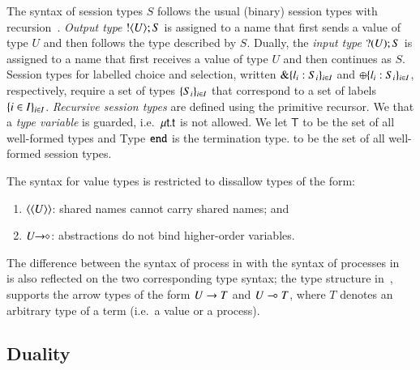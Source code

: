 The syntax of session types $S$ follows the usual
(binary) session types with
recursion~\cite{honda.vasconcelos.kubo:language-primitives,GH05}.
{\em Output type} $! \langle U \rangle ; S$ is assigned to a name that
first sends a value of type $U$ and then follows
the type described by $S$.
Dually, the {\em input type} $? (U) ; S$ is assigned to a name
that first receives a value of type $U$ and then continues as $S$. 
Session types for labelled choice and selection, 
written $\& \{l_i:S_i\}_{i \in I}$ and $\oplus \{l_i:S_i\}_{i \in I}$, respectively,
require a set of types $\{S_i\}_{i \in I}$ that correspond to a set of
labels $\{i \in I\}_{i \in I}$. 
{\em Recursive session types} are defined using the primitive recursor.
We that a {\em type variable} is guarded, i.e.~$\mu\mathsf{t}.\mathsf{t}$ is not allowed.
We let $\mathsf{T}$ to be the set of all well-formed types and
Type $\mathtt{end}$ is the termination type.
\ST to be the set of all well-formed session types.

\begin{remark}
	The syntax for value types is restricted
	to dissallow types of the form:
	\begin{enumerate}[$\bullet$]
		\item	$\langle \langle U \rangle \rangle$: shared names
			cannot carry shared names; and

		\item  $U\!\! \rightarrow\!\! \diamond$: abstractions do not
			bind higher-order variables.
	\end{enumerate}
\end{remark}

The difference between the syntax of process
in \HOp with the syntax of processes in~\cite{tlca07}
is also reflected on the two corresponding type syntax;
the type structure  in~\cite{tlca07}, 
supports the arrow types of the form $U \rightarrow T$ and 
$U \multimap T$, where $T$ denotes an arbitrary type of a term 
(i.e.~a value or a process).


\subsection{Duality}

